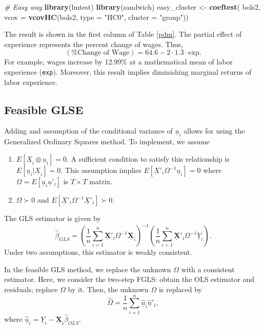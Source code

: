 \documentclass[
  12pt,
]{article}
\newenvironment{Shaded}{\begin{snugshade}}{\end{snugshade}}
\newcommand{\CommentTok}[1]{\textcolor[rgb]{0.56,0.35,0.01}{\textit{#1}}}
\newcommand{\DataTypeTok}[1]{\textcolor[rgb]{0.13,0.29,0.53}{#1}}
\newcommand{\KeywordTok}[1]{\textcolor[rgb]{0.13,0.29,0.53}{\textbf{#1}}}
\newcommand{\NormalTok}[1]{#1}
\newcommand{\StringTok}[1]{\textcolor[rgb]{0.31,0.60,0.02}{#1}}
\providecommand{\tightlist}{%
  \setlength{\itemsep}{0pt}\setlength{\parskip}{0pt}}
\begin{document}
\begin{Shaded}
\begin{Highlighting}[]
\CommentTok{\# Easy way}
\KeywordTok{library}\NormalTok{(lmtest)}
\KeywordTok{library}\NormalTok{(sandwich)}
\NormalTok{easy\_cluster \textless{}{-}}\StringTok{ }\KeywordTok{coeftest}\NormalTok{(}
\NormalTok{  bols2, }\DataTypeTok{vcov =} \KeywordTok{vcovHC}\NormalTok{(bols2, }\DataTypeTok{type =} \StringTok{"HC0"}\NormalTok{, }\DataTypeTok{cluster =} \StringTok{"group"}\NormalTok{))}
\end{Highlighting}
\end{Shaded}

The result is shown in the first column of Table \ref{pdm}. The partial
effect of experience represents the percent change of wages. Thus, \[
  (\text{\% Change of Wage}) = 64.6 - 2 \cdot 1.3 \cdot \text{exp}.
\] For example, wages increase by 12.99\% at a mathematical mean of
labor experience (\texttt{exp}). Moreover, this result implies
diminishing marginal returns of labor experience.

\hypertarget{feasible-glse}{%
\subsection{Feasible GLSE}\label{feasible-glse}}

Adding and assumption of the conditional variance of \(\underline{u}_i\)
allows for using the Generalized Ordinary Squares method. To implement,
we assume

\begin{enumerate}
\def\labelenumi{\arabic{enumi}.}
\tightlist
\item
  \(E[\underline{X}_i \otimes \underline{u}_i] = 0\). A sufficient
  condition to satisfy this relationship is
  \(E[ \underline{u}_i | \underline{X}_i] = 0\). This assumption implies
  \(E[\underline{X}'_i \Omega^{-1} \underline{u}_i] = 0\) where
  \(\Omega = E[\underline{u}_i\underline{u}'_i]\) is \(T \times T\)
  matrix.
\item
  \(\Omega \succ 0\) and
  \(E[\underline{X}'_i \Omega^{-1} \underline{X}'_i] \succ 0\).
\end{enumerate}

The GLS estimator is given by \[
  \hat{\beta}_{GLS} 
  = \left( \frac{1}{n} \sum_{i=1}^n \underline{\mathbf{X}}'_i \Omega^{-1} \underline{\mathbf{X}}_i \right)^{-1}
  \left( \frac{1}{n} \sum_{i=1}^n \underline{\mathbf{X}}'_i \Omega^{-1} \underline{Y}_i \right).
\] Under two assumptions, this estimator is weakly consistent.

In the feasible GLS method, we replace the unknown \(\Omega\) with a
consistent estimator. Here, we consider the two-step FGLS: obtain the
OLS estimator and residuals; replace \(\Omega\) by it. Then, the unknown
\(\Omega\) is replaced by \[
  \hat{\Omega} = \frac{1}{n} \sum_{i=1}^n \underline{\hat{u}}_i\underline{\hat{u}}'_i,
\] where
\(\underline{\hat{u}}_i = \underline{Y}_i - \underline{\mathbf{X}}_i \hat{\beta}_{OLS}\).
\end{document}
